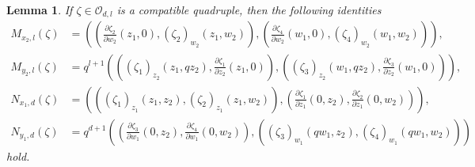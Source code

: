 \documentclass[12pt,reqno]{amsart}%
\theoremstyle{plain}
\newtheorem{lemma}{Lemma}
\numberwithin{theorem}{section} \numberwithin{equation}{section}
\numberwithin{lemma}{section}
\numberwithin{remark}{section}
\numberwithin{example}{section}
\numberwithin{proposition}{section}
\numberwithin{definition}{section}
\numberwithin{corollary}{section}
\begin{document}
\begin{lemma}
\label{lemTech3}If $\zeta\in\mathcal{O}_{d,l}$ is a compatible quadruple, then
the following identities
\begin{align*}
M_{x_{2},l}\left(  \zeta\right)   &  =\left(  \left(  \frac{\partial\zeta_{2}%
}{\partial w_{2}}\left(  z_{1},0\right)  ,\left(  \zeta_{2}\right)  _{w_{2}%
}\left(  z_{1},w_{2}\right)  \right)  ,\left(  \frac{\partial\zeta_{4}%
}{\partial w_{2}}\left(  w_{1},0\right)  ,\left(  \zeta_{4}\right)  _{w_{2}%
}\left(  w_{1},w_{2}\right)  \right)  \right)  ,\\
M_{y_{2},l}\left(  \zeta\right)   &  =q^{l+1}\left(  \left(  \left(  \zeta
_{1}\right)  _{z_{2}}\left(  z_{1},qz_{2}\right)  ,\frac{\partial\zeta_{1}%
}{\partial z_{2}}\left(  z_{1},0\right)  \right)  ,\left(  \left(  \zeta
_{3}\right)  _{z_{2}}\left(  w_{1},qz_{2}\right)  ,\frac{\partial\zeta_{3}%
}{\partial z_{2}}\left(  w_{1},0\right)  \right)  \right)  ,\\
N_{x_{1},d}\left(  \zeta\right)   &  =\left(  \left(  \left(  \zeta
_{1}\right)  _{z_{1}}\left(  z_{1},z_{2}\right)  ,\left(  \zeta_{2}\right)
_{z_{1}}\left(  z_{1},w_{2}\right)  \right)  ,\left(  \frac{\partial\zeta_{1}%
}{\partial z_{1}}\left(  0,z_{2}\right)  ,\frac{\partial\zeta_{2}}{\partial
z_{1}}\left(  0,w_{2}\right)  \right)  \right)  ,\\
N_{y_{1},d}\left(  \zeta\right)   &  =q^{d+1}\left(  \left(  \frac
{\partial\zeta_{3}}{\partial w_{1}}\left(  0,z_{2}\right)  ,\frac
{\partial\zeta_{4}}{\partial w_{1}}\left(  0,w_{2}\right)  \right)  ,\left(
\left(  \zeta_{3}\right)  _{w_{1}}\left(  qw_{1},z_{2}\right)  ,\left(
\zeta_{4}\right)  _{w_{1}}\left(  qw_{1},w_{2}\right)  \right)  \right)
\end{align*}
hold.
\end{lemma}
\end{document}
